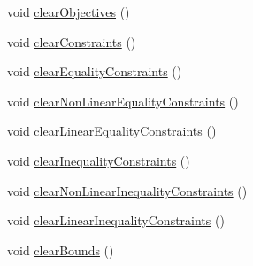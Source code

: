 {\bf }\par
\begin{DoxyCompactItemize}
\item 
void \hyperlink{classocra_1_1FSQPSolver_a7ee778eb0dc102d86d119dcb852f0cfd}{clear\+Objectives} ()
\item 
void \hyperlink{classocra_1_1FSQPSolver_ad74bdd1aa05a475e0d6b5895541ed55e}{clear\+Constraints} ()
\item 
void \hyperlink{classocra_1_1FSQPSolver_af03bfb0f28ff313b79c9d65986a443b1}{clear\+Equality\+Constraints} ()
\item 
void \hyperlink{classocra_1_1FSQPSolver_a9220b29b0887196a700b38b95d7c67e9}{clear\+Non\+Linear\+Equality\+Constraints} ()
\item 
void \hyperlink{classocra_1_1FSQPSolver_a41a84fdd4c110d93043da6cf524beb31}{clear\+Linear\+Equality\+Constraints} ()
\item 
void \hyperlink{classocra_1_1FSQPSolver_a45e3e41dfac944a74e85191078e979b4}{clear\+Inequality\+Constraints} ()
\item 
void \hyperlink{classocra_1_1FSQPSolver_a873b6761f0cf4efd61ba3bc04cc88897}{clear\+Non\+Linear\+Inequality\+Constraints} ()
\item 
void \hyperlink{classocra_1_1FSQPSolver_a9658de4e998f7d3a5a65cad0288de4c3}{clear\+Linear\+Inequality\+Constraints} ()
\item 
void \hyperlink{classocra_1_1FSQPSolver_abf1583232819707717f59a6d26604d48}{clear\+Bounds} ()
\end{DoxyCompactItemize}

